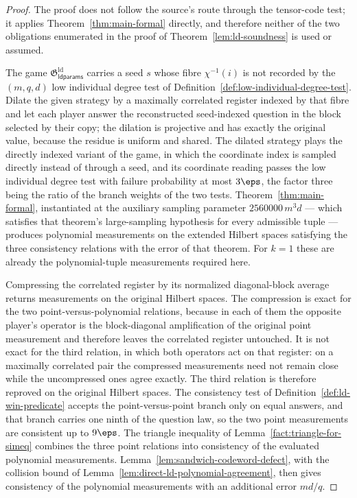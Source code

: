 \begin{proof}
	\leanok
	The proof does not follow the source's route through the tensor-code test; it applies Theorem~\ref{thm:main-formal} directly, and therefore neither of the two obligations enumerated in the proof of Theorem~\ref{lem:ld-soundness} is used or assumed.

	The game $\mathfrak{G}^{\mathrm{ld}}_{\mathsf{ldparams}}$ carries a seed $s$ whose fibre $\chi^{-1}(i)$ is not recorded by the $(m,q,d)$ low individual degree test of Definition~\ref{def:low-individual-degree-test}. Dilate the given strategy by a maximally correlated register indexed by that fibre and let each player answer the reconstructed seed-indexed question in the block selected by their copy; the dilation is projective and has exactly the original value, because the residue is uniform and shared. The dilated strategy plays the directly indexed variant of the game, in which the coordinate index is sampled directly instead of through a seed, and its coordinate reading passes the low individual degree test with failure probability at most $3\eps$, the factor three being the ratio of the branch weights of the two tests. Theorem~\ref{thm:main-formal}, instantiated at the auxiliary sampling parameter $2560000\,m^3 d$ --- which satisfies that theorem's large-sampling hypothesis for every admissible tuple --- produces polynomial measurements on the extended Hilbert spaces satisfying the three consistency relations with the error of that theorem. For $k = 1$ these are already the polynomial-tuple measurements required here.

	Compressing the correlated register by its normalized diagonal-block average returns measurements on the original Hilbert spaces. The compression is exact for the two point-versus-polynomial relations, because in each of them the opposite player's operator is the block-diagonal amplification of the original point measurement and therefore leaves the correlated register untouched. It is not exact for the third relation, in which both operators act on that register: on a maximally correlated pair the compressed measurements need not remain close while the uncompressed ones agree exactly. The third relation is therefore reproved on the original Hilbert spaces. The consistency test of Definition~\ref{def:ld-win-predicate} accepts the point-versus-point branch only on equal answers, and that branch carries one ninth of the question law, so the two point measurements are consistent up to $9\eps$.
	The triangle inequality of Lemma~\ref{fact:triangle-for-simeq} combines the three point relations into consistency of the evaluated polynomial measurements. Lemma~\ref{lem:sandwich-codeword-defect}, with the collision bound of Lemma~\ref{lem:direct-ld-polynomial-agreement}, then gives consistency of the polynomial measurements with an additional error $md/q$.


\end{proof}
